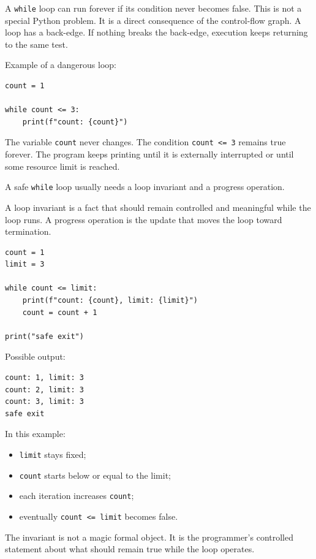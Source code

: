 A \texttt{while} loop can run forever if its condition never becomes false. This is not a special Python problem. It is a direct consequence of the control-flow graph. A loop has a back-edge. If nothing breaks the back-edge, execution keeps returning to the same test.

Example of a dangerous loop:

\begin{verbatim}
count = 1

while count <= 3:
    print(f"count: {count}")
\end{verbatim}

The variable \texttt{count} never changes. The condition \texttt{count <= 3} remains true forever. The program keeps printing until it is externally interrupted or until some resource limit is reached.

A safe \texttt{while} loop usually needs a loop invariant and a progress operation.

A loop invariant is a fact that should remain controlled and meaningful while the loop runs. A progress operation is the update that moves the loop toward termination.

\begin{verbatim}
count = 1
limit = 3

while count <= limit:
    print(f"count: {count}, limit: {limit}")
    count = count + 1

print("safe exit")
\end{verbatim}

Possible output:

\begin{verbatim}
count: 1, limit: 3
count: 2, limit: 3
count: 3, limit: 3
safe exit
\end{verbatim}

In this example:

\begin{itemize}
    \item \texttt{limit} stays fixed;
    \item \texttt{count} starts below or equal to the limit;
    \item each iteration increases \texttt{count};
    \item eventually \texttt{count <= limit} becomes false.
\end{itemize}

The invariant is not a magic formal object. It is the programmer's controlled statement about what should remain true while the loop operates.

